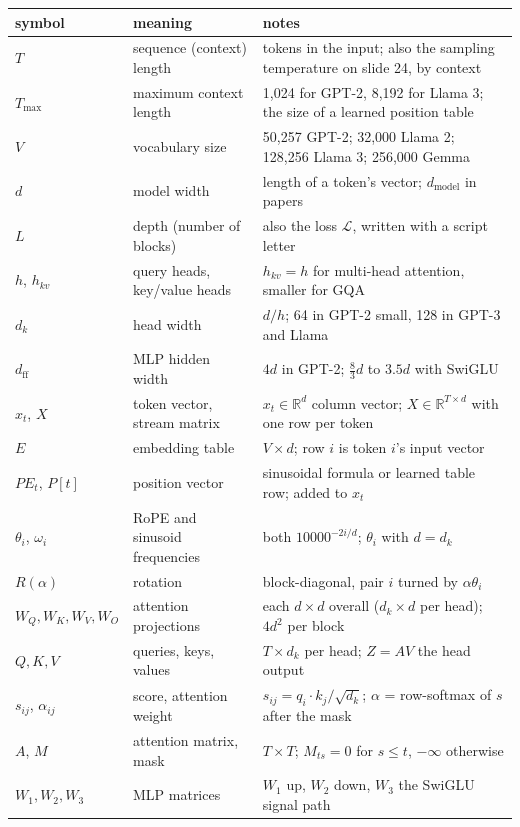 \documentclass[11pt,letterpaper]{article}
\newcommand{\dff}{d_{\mathrm{ff}}}
\newcommand{\dk}{d_k}
\newcommand{\Tmax}{T_{\max}}
\begin{document}
\begin{center}\footnotesize\setlength{\tabcolsep}{4pt}
\begin{tabular}{@{}lp{3.6cm}p{7.4cm}@{}}
\toprule
symbol & meaning & notes\\
\midrule
$T$ & sequence (context) length & tokens in the input; also the sampling temperature on slide 24, by context\\
$\Tmax$ & maximum context length & 1,024 for GPT-2, 8,192 for Llama 3; the size of a learned position table\\
$V$ & vocabulary size & 50,257 GPT-2; 32,000 Llama 2; 128,256 Llama 3; 256,000 Gemma\\
$d$ & model width & length of a token's vector; $d_{\text{model}}$ in papers\\
$L$ & depth (number of blocks) & also the loss $\mathcal{L}$, written with a script letter\\
$h$, $h_{kv}$ & query heads, key/value heads & $h_{kv}=h$ for multi-head attention, smaller for GQA\\
$\dk$ & head width & $d/h$; 64 in GPT-2 small, 128 in GPT-3 and Llama\\
$\dff$ & MLP hidden width & $4d$ in GPT-2; $\tfrac83d$ to $3.5d$ with SwiGLU\\
$x_t$, $X$ & token vector, stream matrix & $x_t\in\mathbb{R}^d$ column vector; $X\in\mathbb{R}^{T\times d}$ with one row per token\\
$E$ & embedding table & $V\times d$; row $i$ is token $i$'s input vector\\
$PE_t$, $P[t]$ & position vector & sinusoidal formula or learned table row; added to $x_t$\\
$\theta_i$, $\omega_i$ & RoPE and sinusoid frequencies & both $10000^{-2i/d}$; $\theta_i$ with $d=\dk$\\
$R(\alpha)$ & rotation & block-diagonal, pair $i$ turned by $\alpha\theta_i$\\
$W_Q,W_K,W_V,W_O$ & attention projections & each $d\times d$ overall ($\dk\times d$ per head); $4d^2$ per block\\
$Q,K,V$ & queries, keys, values & $T\times\dk$ per head; $Z=AV$ the head output\\
$s_{ij}$, $\alpha_{ij}$ & score, attention weight & $s_{ij}=q_i\cdot k_j/\sqrt{\dk}$; $\alpha$ = row-softmax of $s$ after the mask\\
$A$, $M$ & attention matrix, mask & $T\times T$; $M_{ts}=0$ for $s\le t$, $-\infty$ otherwise\\
$W_1,W_2,W_3$ & MLP matrices & $W_1$ up, $W_2$ down, $W_3$ the SwiGLU signal path\\

\end{tabular}
\end{center}
\end{document}
